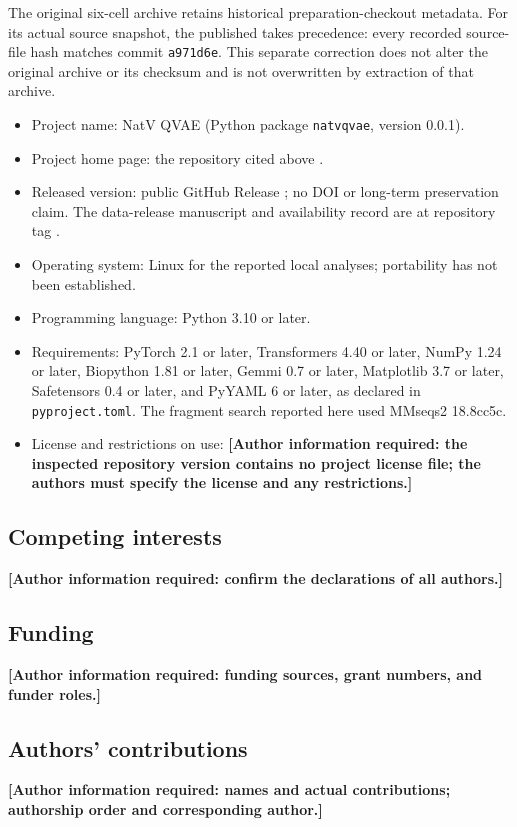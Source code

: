 \documentclass[referee,pdflatex,sn-vancouver-num]{sn-jnl}
\newcommand{\pending}[1]{\textbf{[Author information required: #1]}}
\begin{document}
The original six-cell archive retains historical preparation-checkout metadata. For its actual source snapshot, the published  takes precedence: every recorded source-file hash matches commit \texttt{a971d6e}. This separate correction does not alter the original archive or its checksum and is not overwritten by extraction of that archive.

\begin{itemize}
\item Project name: NatV QVAE (Python package \texttt{natvqvae}, version 0.0.1).
\item Project home page: the repository cited above \cite{natvrepo}.
\item Released version: public GitHub Release \cite{natvdata}; no DOI or long-term preservation claim. The data-release manuscript and availability record are at repository tag .
\item Operating system: Linux for the reported local analyses; portability has not been established.
\item Programming language: Python 3.10 or later.
\item Requirements: PyTorch 2.1 or later, Transformers 4.40 or later, NumPy 1.24 or later, Biopython 1.81 or later, Gemmi 0.7 or later, Matplotlib 3.7 or later, Safetensors 0.4 or later, and PyYAML 6 or later, as declared in \texttt{pyproject.toml}. The fragment search reported here used MMseqs2 18.8cc5c.
\item License and restrictions on use: \pending{the inspected repository version contains no project license file; the authors must specify the license and any restrictions.}
\end{itemize}
\subsection*{Competing interests}
\pending{confirm the declarations of all authors.}
\subsection*{Funding}
\pending{funding sources, grant numbers, and funder roles.}
\subsection*{Authors' contributions}
\pending{names and actual contributions; authorship order and corresponding author.}
\end{document}
